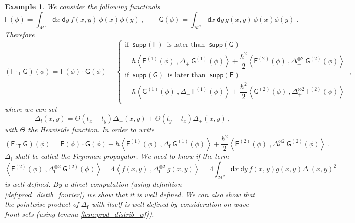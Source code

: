 \documentclass[11pt]{book}
\newcommand{\supp}{\mathsf{supp}}
\newcommand{\sm}[1]{\left\langle#1\right\rangle}
\newcommand{\Mcal}{\mathcal{M}}
\newcommand{\Fsf}{\mathsf{F}}
\newcommand{\Gsf}{\mathsf{G}}
\newcommand{\Tsf}{\mathsf{T}}
\newcommand{\dsf}{\mathsf{d}}
\newcommand{\fsf}{\mathsf{f}}
\theoremstyle{break}
\newtheorem{example}{Example}[chapter]
\begin{document}
\begin{example}
We consider the following functinals
%
\begin{equation*}
\Fsf(\phi) = \int_{\Mcal^2} \dsf x \ \dsf y \ f(x,y) \ \phi(x) \phi(y)\ , \qquad \Gsf(\phi) = \int_{\Mcal^2} \dsf x \ \dsf y \ g(x,y) \ \phi(x) \phi(y) \ .
\end{equation*}
%
Therefore
%
\begin{equation*}
(\Fsf \cdot_\Tsf \Gsf)(\phi) = \Fsf(\phi) \cdot \Gsf(\phi) + 
\left\{
\begin{array}{ll}
\mbox{if } \ \supp(\Fsf) \ \mbox{ is later than  } \ \supp(\Gsf)  \\[4pt]
\quad \hbar \sm{\Fsf^{(1)}(\phi) \ , \Delta_+ \ \Gsf^{(1)}(\phi)} + \dfrac{\hbar^2}{2} \sm{\Fsf^{(2)}(\phi) \ , \Delta_+^{\otimes 2} \ \Gsf^{(2)}(\phi)} \\[8pt]
%
\mbox{if } \ \supp(\Gsf) \ \mbox{ is later than  } \ \supp(\Fsf)  \\[4pt]
\quad \hbar \sm{\Gsf^{(1)}(\phi) \ , \Delta_+ \ \Fsf^{(1)}(\phi)} + \dfrac{\hbar^2}{2} \sm{\Gsf^{(2)}(\phi) \ , \Delta_+^{\otimes 2} \ \Fsf^{(2)}(\phi)} \\
\end{array}
\right. \ ,
\end{equation*}
%
where we can set
%
\begin{equation}
\Delta_\fsf(x,y) = \Theta(t_x-t_y) \Delta_+(x,y) + \Theta(t_y-t_x) \Delta_+(x,y) \ ,
\label{eq:feynman_relation}
\end{equation}
%
with $\Theta$ the Heaviside function. In order to write
%
\begin{equation*}
(\Fsf \cdot_\Tsf \Gsf)(\phi) = \Fsf(\phi) \cdot \Gsf(\phi) + \hbar \sm{\Fsf^{(1)}(\phi) \ , \Delta_\fsf \ \Gsf^{(1)}(\phi)} + \dfrac{\hbar^2}{2} \sm{\Fsf^{(2)}(\phi) \ , \Delta_\fsf^{\otimes 2} \ \Gsf^{(2)}(\phi)} \ .
\end{equation*}
$\Delta_\fsf$ shall be called the Feynman propagator. We need to know if the term
%
\begin{equation*}
\sm{\Fsf^{(2)}(\phi) \ , \Delta_\fsf^{\otimes 2} \ \Gsf^{(2)}(\phi)} = 4 \sm{f(x,y) \ , \Delta_\fsf^{\otimes 2} \ g(x,y)} = 4 \int_{\Mcal^2} \dsf x \ \dsf y \ f(x,y) g(x,y) \Delta_\fsf(x,y)^2
\end{equation*}
%
is well defined. By a direct computation (using definition \ref{def:prod_distib_fourier}) we show that it is well defined. We can also show that the pointwise product of $\Delta_\fsf$ with itself is well defined by consideration on wave front sets (using lemma \ref{lem:prod_distrib_wf}).
\end{example}
\end{document}
